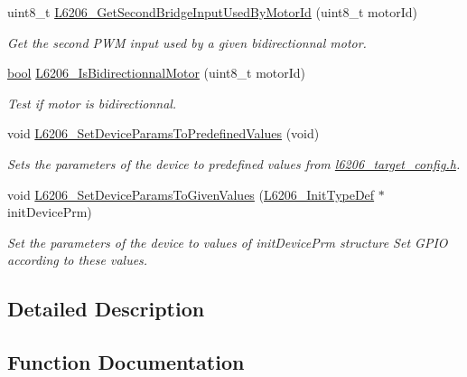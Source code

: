 \begin{DoxyCompactItemize}
uint8\+\_\+t \mbox{\hyperlink{group___l6206___private__functions_gab3eaf311ee61a8f3ab177db80f5d7698}{L6206\+\_\+\+Get\+Second\+Bridge\+Input\+Used\+By\+Motor\+Id}} (uint8\+\_\+t motor\+Id)
\begin{DoxyCompactList}\small\item\em Get the second P\+WM input used by a given bidirectionnal motor. \end{DoxyCompactList}\item 
\mbox{\hyperlink{group___motor___boolean___type_ga0ecf26b576b9a54eca656b9be7ba6a06}{bool}} \mbox{\hyperlink{group___l6206___private__functions_ga3f9ca538e4da03d6cb2f502d4a1b759c}{L6206\+\_\+\+Is\+Bidirectionnal\+Motor}} (uint8\+\_\+t motor\+Id)
\begin{DoxyCompactList}\small\item\em Test if motor is bidirectionnal. \end{DoxyCompactList}\item 
void \mbox{\hyperlink{group___l6206___private__functions_ga1e49f28c219e930c3eacdadee0079bfa}{L6206\+\_\+\+Set\+Device\+Params\+To\+Predefined\+Values}} (void)
\begin{DoxyCompactList}\small\item\em Sets the parameters of the device to predefined values from \mbox{\hyperlink{l6206__target__config_8h}{l6206\+\_\+target\+\_\+config.\+h}}. \end{DoxyCompactList}\item 
void \mbox{\hyperlink{group___l6206___private__functions_ga3379bc215227e0a4081b7a42f3c5532a}{L6206\+\_\+\+Set\+Device\+Params\+To\+Given\+Values}} (\mbox{\hyperlink{struct_l6206___init_type_def}{L6206\+\_\+\+Init\+Type\+Def}} $\ast$init\+Device\+Prm)
\begin{DoxyCompactList}\small\item\em Set the parameters of the device to values of init\+Device\+Prm structure Set G\+P\+IO according to these values. \end{DoxyCompactList}\end{DoxyCompactItemize}


\subsection{Detailed Description}


\subsection{Function Documentation}
\mbox{\label{group___l6206___private__functions_ga0e92a09f08eaaf3145c79ecf069dce03}} 

